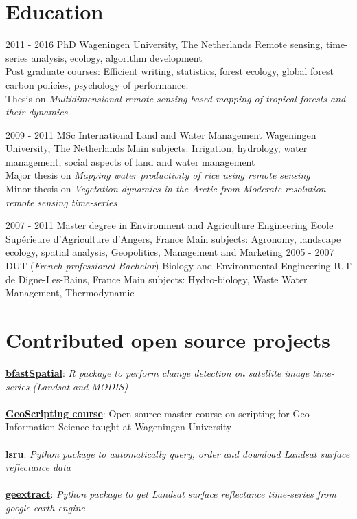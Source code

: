 \documentclass[]{friggeri-cv}
\begin{document}
\section{Education}
\begin{entrylist}
  \entry
    {2011 - 2016}
    {PhD}
    {Wageningen University, The Netherlands}
    {Remote sensing, time-series analysis, ecology, algorithm development\\
    Post graduate courses: Efficient writing, statistics, forest ecology, global forest carbon policies, psychology of performance.\\
    Thesis on \emph{Multidimensional remote sensing based mapping of tropical forests and their dynamics}\\}

  \entry
    {2009 - 2011}
    {MSc International Land and Water Management}
    {Wageningen University, The Netherlands}
    {Main subjects: Irrigation, hydrology, water management, social aspects of land and water management \\
    Major thesis on \emph{Mapping water productivity of rice using remote sensing}\\
    Minor thesis on \emph{Vegetation dynamics in the Arctic from Moderate resolution remote sensing time-series}\\}
\end{entrylist}

\begin{entrylist}
  \entry
    {2007 - 2011}
    {Master degree in Environment and Agriculture Engineering}
    {Ecole Supérieure d'Agriculture d'Angers, France}
    {Main subjects: Agronomy, landscape ecology, spatial analysis, Geopolitics, Management and Marketing}
  \entry
    {2005 - 2007}
    {DUT (\textit{French professional Bachelor}) Biology and Environmental Engineering}
    {IUT de Digne-Les-Bains, France}
    {Main subjects: Hydro-biology, Waste Water Management, Thermodynamic}
\end{entrylist}

\section{Contributed open source projects}
    \href{https://github.com/loicdtx/bfastspatial}{\textbf{bfastSpatial}}: \textit{R package to perform change detection on satellite image time-series (Landsat and MODIS)}\\
    \\
    \href{http://geoscripting-wur.github.io/}{\textbf{GeoScripting course}}: Open source master course on scripting for Geo-Information Science taught at Wageningen University\\
    \\
    \href{https://github.com/loicdtx/lsru}{\textbf{lsru}}: \textit{Python package to automatically query, order and download Landsat surface reflectance data}\\
    \\
    \href{https://github.com/loicdtx/landsat-extract-gee}{\textbf{geextract}}: \textit{Python package to get Landsat surface reflectance time-series from google earth engine}\\
    \\
\end{document}
